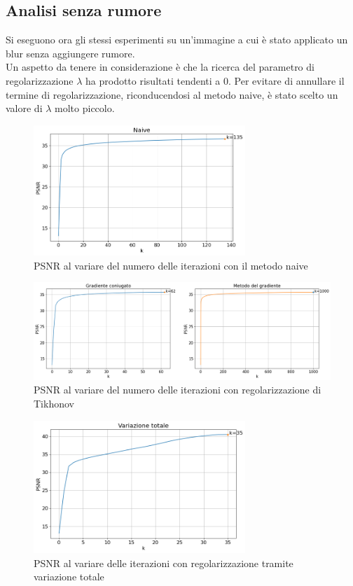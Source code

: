 \documentclass[11pt]{article}
\begin{document}
\subsection{Analisi senza rumore}
Si eseguono ora gli stessi esperimenti su un'immagine a cui è stato applicato un blur senza aggiungere rumore.\\
Un aspetto da tenere in considerazione è che la ricerca del parametro di regolarizzazione $\lambda$ ha prodotto risultati tendenti a 0. Per evitare di annullare il termine di regolarizzazione, riconducendosi al metodo naive, è stato scelto un valore di $\lambda$ molto piccolo.

\begin{figure}[H]
    \centering
    \includegraphics[width=8cm]{semiconvergenza/3/psnr_naive.png}
    \caption{PSNR al variare del numero delle iterazioni con il metodo naive}
    \label{fig:semiconv_psnr_naive3}
\end{figure}
\begin{figure}[H]
    \centering
    \includegraphics[width=15cm]{semiconvergenza/3/psnr_tikhonov.png}
    \caption{PSNR al variare del numero delle iterazioni con regolarizzazione di Tikhonov}
    \label{fig:semiconv_deblur_tikhonov3}
\end{figure}
\begin{figure}[H]
    \centering
    \includegraphics[width=8cm]{semiconvergenza/3/psnr_tv.png}
    \caption{PSNR al variare delle iterazioni con regolarizzazione tramite variazione totale}
    \label{fig:semiconv_deblur_tv3}
\end{figure}
\end{document}
